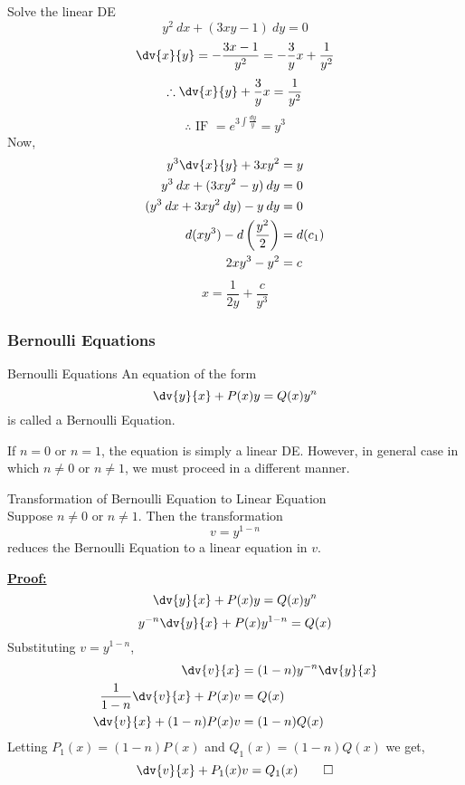 \begin{example}{Solve the linear DE \[
    y^2 \: d{x} + (3xy-1) \: d{y} = 0
\]}{} \vspace{-20pt}
    \[ \dv{x}{y} = -\frac{3x-1}{y^2} = -\frac{3}{y}x + \frac{1}{y^2} \]
    \[ \therefore \dv{x}{y} + \frac{3}{y}x = \frac{1}{y^2} \]
    \[ \therefore \text{ IF } = e^{3 \int{\frac{dy}{y}}} = y^3 \]
    Now,
    \begin{align*}
        y^3\dv{x}{y} + 3xy^2 &= y \\
        y^3 \: dx + (3xy^2 - y) \: dy &= 0 \\
        (y^3 \: dx + 3xy^2 \: dy) - y \: dy &= 0 \\
        d(xy^3) - d\left( \frac{y^2}{2} \right) &= d(c_1) \\
        2xy^3 - y^2 &= c
    \end{align*}
    \[ \boxed{ x = \frac{1}{2y} + \frac{c}{y^3} } \]
\end{example} \vspace{10pt}


\vspace{20pt}
\subsubsection{Bernoulli Equations}

\begin{definition}{Bernoulli Equations}{}
    An equation of the form \[
        \dv{y}{x} + P(x)y = Q(x)y^n
    \] is called a Bernoulli Equation. \\
\end{definition} \vspace{10pt}

If $n=0$ or $n=1$, the equation is simply a linear DE. However, in general case in which $n \neq 0$ or $n \neq 1$, we must proceed in a different manner.

\begin{theorem}{Transformation of Bernoulli Equation to Linear Equation}{}
    \\Suppose $n \neq 0$ or $n \neq 1$. Then the transformation  \[
        v = y^{1-n}
    \] reduces the Bernoulli Equation to a linear equation in $v$.
\end{theorem}

\underline{\textbf{Proof:}}\\
\[ \dv{y}{x} + P(x)y = Q(x) y^n \]
\[ y^{-n}\dv{y}{x} + P(x)y^{1-n} = Q(x) \]
Substituting $v = y^{1-n}$,
\begin{align*}
    \dv{v}{x} &= (1-n)y^{-n}\dv{y}{x} \\
    \frac{1}{1-n}\dv{v}{x} + P(x)v &= Q(x) \\
    \dv{v}{x} + (1-n)P(x)v &= (1-n)Q(x)
\end{align*}
Letting $P_1(x) = (1-n)P(x)$ and $Q_1(x) = (1-n)Q(x)$ we get,
\[ \dv{v}{x} + P_1(x)v = Q_1(x) \qed \] 

